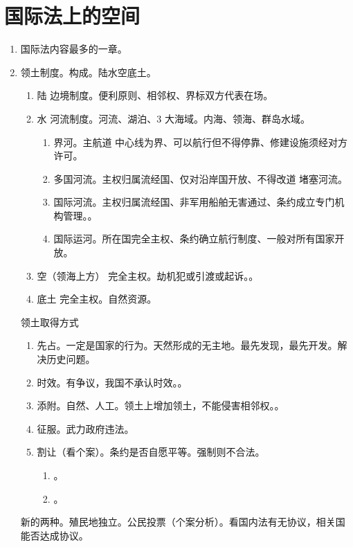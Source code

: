\section{国际法上的空间}
\begin{enumerate}
  \item 国际法内容最多的一章。
  \item 领土制度。构成。陆水空底土。
        \begin{enumerate}
          \item 陆 \yjt 边境制度。便利原则、相邻权、界标双方代表在场。
          \item 水 \yjt 河流制度。河流、湖泊、3 大海域。内海、领海、群岛水域。
                \begin{enumerate}
                  \item 界河。主航道 \hz 中心线为界、可以航行但不得停靠、修建设施须经对方许可。
                  \item 多国河流。主权归属流经国、仅对沿岸国开放、不得改道 \hz 堵塞河流。
                  \item 国际河流。主权归属流经国、非军用船舶无害通过、条约成立专门机构管理。。
                  \item 国际运河。所在国完全主权、条约确立航行制度、一般对所有国家开放。
                \end{enumerate}
          \item 空（领海上方） \yjt 完全主权。劫机犯或引渡或起诉。。
          \item 底土 \yjt 完全主权。自然资源。
        \end{enumerate}

        \begin{kk}{领土取得方式}
          \begin{enumerate}
            \item 先占。一定是国家的行为。天然形成的无主地。\bdy 最先发现，最先开发。解决历史问题。
            \item 时效。有争议，我国不承认时效。。
            \item 添附。自然、人工。领土上增加领土，不能侵害相邻权。。
            \item 征服。武力政府违法。
            \item 割让（看个案）。条约是否自愿平等。强制则不合法。
                  \begin{enumerate}
                    \item {}。
                    \item {}。
                  \end{enumerate}
          \end{enumerate}
          \tcblower
          新的两种。\yi 殖民地独立。\er 公民投票（个案分析）。看国内法有无协议，相关国能否达成协议。
        \end{kk}


\end{enumerate}

